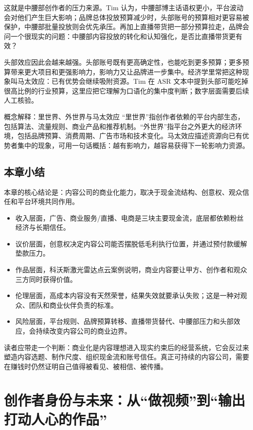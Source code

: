 \documentclass[a4paper]{article}
\begin{document}
这就是中腰部创作者的压力来源。Tim 认为，中腰部博主话语权更小，平台波动会对他们产生巨大影响；品牌总体投放预算减少时，头部账号的预算相对更容易被保护，中腰部批量投放则会优先承压。再加上直播带货把一部分预算拉走，品牌会问一个很现实的问题：中腰部内容投放的转化和认知强化，是否比直播带货更有效？

头部效应因此会越来越强。头部账号既有更高确定性，也能吃到更多预算；更多预算带来更大项目和更强影响力，影响力又让品牌进一步集中。经济学里常把这种现象叫马太效应：已有优势会继续吸附资源。Tim 在 ASR 文本中提到头部可能吃掉很高比例的行业预算，这里应把它理解为口语化的集中度判断；数字层面需要后续人工核验。

\begin{knowledgebox}{概念解释：里世界、外世界与马太效应}
“里世界”指创作者依赖的平台内部生态，包括算法、流量规则、商业产品和推荐机制。“外世界”指平台之外更大的经济环境，包括品牌预算、消费周期、广告市场和技术变化。马太效应描述资源向已有优势者集中的现象，可用一句话概括：越有影响力，越容易获得下一轮影响力资源。
\end{knowledgebox}

\subsection{本章小结}

本章的核心结论是：内容公司的商业化能力，取决于现金流结构、创意权、观众信任和平台环境共同作用。

\begin{itemize}
  \item 收入层面，广告、商业服务/直播、电商是三块主要现金流，底层都依赖粉丝经济与长期信任。
  \item 议价层面，创意权决定内容公司能否摆脱低毛利执行位置，并通过预付款缓解垫款压力。
  \item 作品层面，科沃斯激光雷达点云案例说明，商业内容要让甲方、创作者和观众三方同时获得价值。
  \item 伦理层面，高成本内容没有天然荣誉，结果失效就要承认失败；这是一种对观众、团队和商业伙伴负责的标准。
  \item 风险层面，平台规则、品牌预算转移、直播带货替代、中腰部压力和头部效应，会持续改变内容公司的商业边界。
\end{itemize}

读者应带走一个判断：商业化是内容理想进入现实约束后的经营系统，它会反过来塑造内容选题、制作尺度、组织现金流和账号信任。真正可持续的内容公司，需要在赚钱时仍然证明自己值得被看见、被相信、被传播。
\section{创作者身份与未来：从“做视频”到“输出打动人心的作品”}
\end{document}
